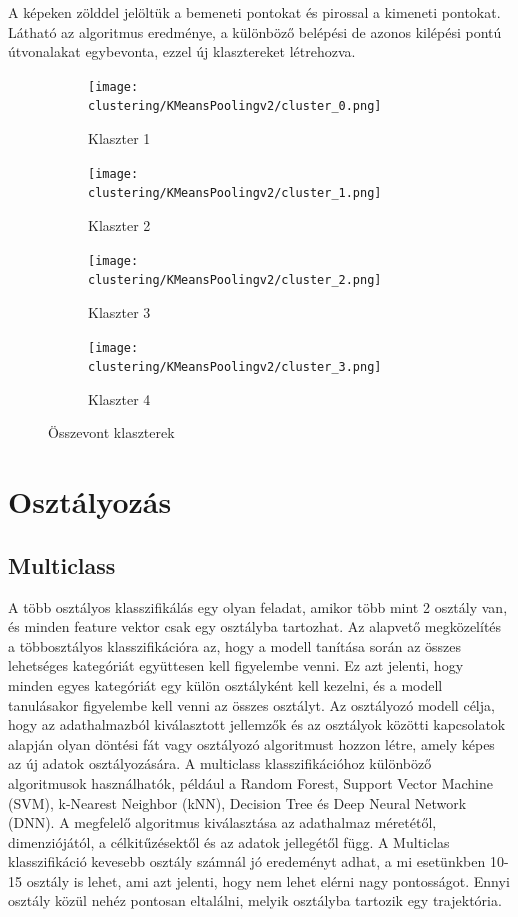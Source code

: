 \documentclass[12pt,a4paper]{article}
\begin{document}
A képeken zölddel jelöltük a bemeneti pontokat és pirossal a kimeneti pontokat. Látható az algoritmus eredménye, a különböző belépési de azonos kilépési pontú útvonalakat egybevonta, ezzel új klasztereket létrehozva.
\begin{figure}[ht]
    \centering
    \begin{subfigure}{0.45\textwidth}
        \centering
        \texttt{[image: clustering/KMeansPoolingv2/cluster\_0.png]}
        \caption{Klaszter 1}
        \label{fig:cluster1}
    \end{subfigure}
    \hfill
    \begin{subfigure}{0.45\textwidth}
        \centering
        \texttt{[image: clustering/KMeansPoolingv2/cluster\_1.png]}
        \caption{Klaszter 2}
        \label{fig:cluster2}
    \end{subfigure}
    \hfill
    \begin{subfigure}{0.45\textwidth}
        \centering
        \texttt{[image: clustering/KMeansPoolingv2/cluster\_2.png]}
        \caption{Klaszter 3}
        \label{fig:cluster3}
    \end{subfigure}
    \hfill
    \begin{subfigure}{0.45\textwidth}
        \centering
        \texttt{[image: clustering/KMeansPoolingv2/cluster\_3.png]}
        \caption{Klaszter 4}
        \label{fig:cluster4}
    \end{subfigure}
    \caption{Összevont klaszterek}
    \label{fig:pooledclusters}
\end{figure}

\newpage
\section{Osztályozás}
\subsection{Multiclass}
A több osztályos klasszifikálás egy olyan feladat, amikor több mint 2 osztály van, és minden feature vektor csak egy osztályba tartozhat. Az alapvető megközelítés a többosztályos klasszifikációra az, hogy a modell tanítása során az összes lehetséges kategóriát együttesen kell figyelembe venni. Ez azt jelenti, hogy minden egyes kategóriát egy külön osztályként kell kezelni, és a modell tanulásakor figyelembe kell venni az összes osztályt. Az osztályozó modell célja, hogy az adathalmazból kiválasztott jellemzők és az osztályok közötti kapcsolatok alapján olyan döntési fát vagy osztályozó algoritmust hozzon létre, amely képes az új adatok osztályozására. A multiclass klasszifikációhoz különböző algoritmusok használhatók, például a Random Forest, Support Vector Machine (SVM), k-Nearest Neighbor (kNN), Decision Tree és Deep Neural Network (DNN). A megfelelő algoritmus kiválasztása az adathalmaz méretétől, dimenziójától, a célkitűzésektől és az adatok jellegétől függ.
A Multiclas klasszifikáció kevesebb osztály számnál jó eredeményt adhat, a mi esetünkben 10-15 osztály is lehet, ami azt jelenti, hogy nem lehet elérni nagy pontosságot. Ennyi osztály közül nehéz pontosan eltalálni, melyik osztályba tartozik egy trajektória.
\end{document}
